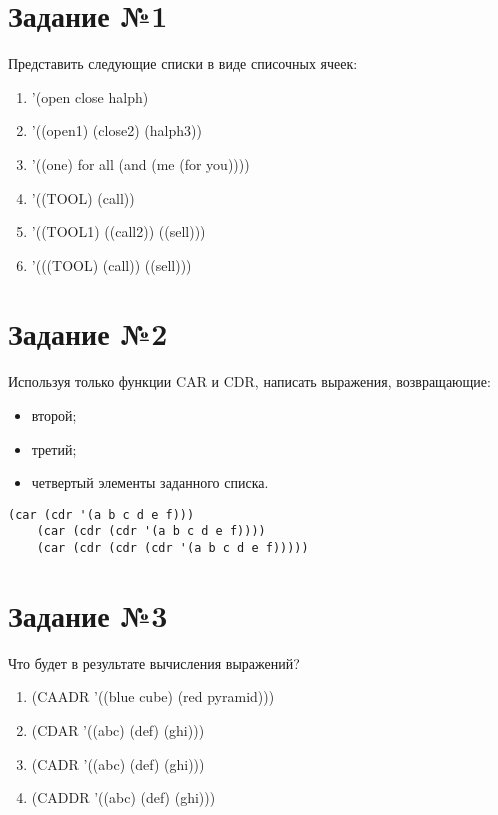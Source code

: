 \chapter{Задание №1}

Представить следующие списки в виде списочных ячеек:
\begin{enumerate}
    \item '(open close halph)
    \item '((open1) (close2) (halph3))
    \item '((one) for all (and (me (for you))))
    \item '((TOOL) (call))
    \item '((TOOL1) ((call2)) ((sell)))
    \item '(((TOOL) (call)) ((sell)))
\end{enumerate}



\chapter{Задание №2}

Используя только функции CAR и CDR, написать выражения,
возвращающие:
\begin{itemize}
    \item второй;
    \item третий;
    \item четвертый элементы заданного списка.
\end{itemize}

\begin{center}
    \captionsetup{justification=raggedright,singlelinecheck=off}
    \begin{lstlisting}[label=lst:task_2,caption=Решение задания №2]
    (car (cdr '(a b c d e f)))
    (car (cdr (cdr '(a b c d e f))))
    (car (cdr (cdr (cdr '(a b c d e f)))))
\end{lstlisting}
\end{center}


\chapter{Задание №3}

Что будет в результате вычисления выражений?

\begin{enumerate}
    \item (CAADR '((blue cube) (red pyramid)))
    \item (CDAR '((abc) (def) (ghi)))
    \item (CADR '((abc) (def) (ghi)))
    \item (CADDR '((abc) (def) (ghi)))
\end{enumerate}

